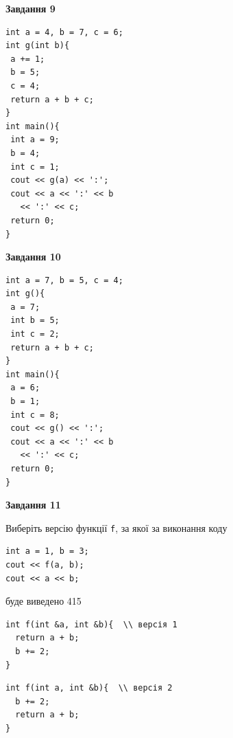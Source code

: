 \documentclass[12pt, ukrainian]{article}
\def\code#1{\Verb!#1!}
\begin{document}
{\begin {large}
\begin{minipage}[t]{11.0cm}
\end{minipage}


\begin{minipage}[t]{7.0cm}

\begin{center}
\textbf{Завдання 9}
\end{center}
\vspace{-8mm}

\begin{verbatim}
int a = 4, b = 7, c = 6;
int g(int b){
 a += 1;
 b = 5;
 c = 4;
 return a + b + c;
}
int main(){
 int a = 9;
 b = 4;
 int c = 1;
 cout << g(a) << ':';
 cout << a << ':' << b 
   << ':' << c;
 return 0;
}
\end{verbatim}



\begin{center}
\textbf{Завдання 10}
\end{center}
\vspace{-8mm}

\begin{verbatim}
int a = 7, b = 5, c = 4;
int g(){
 a = 7;
 int b = 5;
 int c = 2;
 return a + b + c;
}
int main(){
 a = 6;
 b = 1;
 int c = 8;
 cout << g() << ':';
 cout << a << ':' << b 
   << ':' << c;
 return 0;
}
\end{verbatim}

\end{minipage}
\vline \hspace{1mm}
\begin{minipage}[t]{11.0cm}

\begin{center}
\textbf{Завдання 11}
\end{center}
Виберіть версію функції \code{f}, за якої за виконання коду
\begin{verbatim}
int a = 1, b = 3;
cout << f(a, b);
cout << a << b;
\end{verbatim}

буде виведено 415

\begin{verbatim}
int f(int &a, int &b){  \\ версія 1
  return a + b;
  b += 2;
}
\end{verbatim}

\vspace{-8mm}\begin{verbatim}
int f(int a, int &b){  \\ версія 2
  b += 2;
  return a + b;
}
\end{verbatim}


\end{minipage}
\end{large}}
\end{document}
